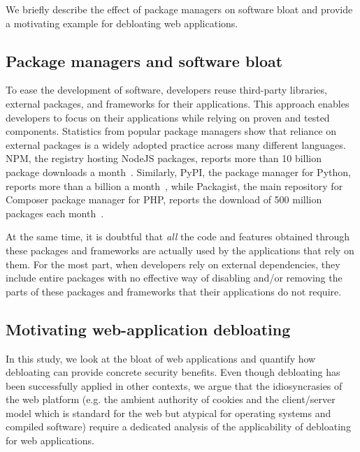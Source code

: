 We briefly describe the effect of package managers on software
bloat and provide a motivating example for debloating web applications.


\subsection{Package managers and software bloat}
To ease the development of software, developers reuse third-party libraries,
external packages, and frameworks for their applications. This approach
enables developers to focus on their applications while relying on
proven and tested components. Statistics from popular package managers show
that reliance on external packages is a widely adopted practice across
many different languages. NPM, the registry hosting NodeJS packages,
reports more than 10 billion package downloads a
month~\cite{nodeDownloads}. Similarly, PyPI, the package manager for Python,
reports more than a billion a month~\cite{pypiDownloads}, while Packagist, the main repository for
Composer package manager for PHP, reports the download of 500 million
packages each month~\cite{packagistDownloads}.

At the same time, it is doubtful that \emph{all} the code and features
obtained through these packages and frameworks are actually used by
the applications that rely on them. For the most part, when developers rely on
external dependencies, they include entire packages with no effective way of
disabling and/or removing the parts of these packages and frameworks that
their applications do not require.

\subsection{Motivating web-application debloating}

In this study, we look at the bloat of web applications and quantify how
debloating can provide concrete security benefits. Even
though debloating has been successfully applied in other contexts, we argue
that the
idiosyncrasies of the web platform (e.g. the ambient authority of cookies and
the client/server model which is standard for the web but atypical
for operating systems and compiled software) require a dedicated analysis
of the applicability of debloating for web applications.

